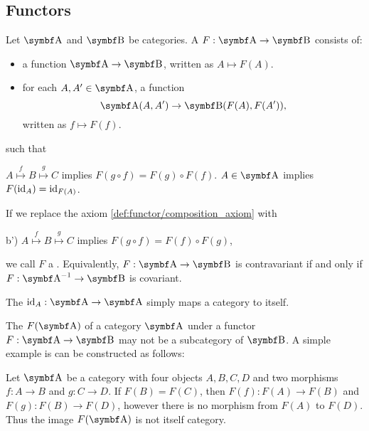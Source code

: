 \subsection{Functors}\label{subsec:functors}

\begin{definition}\label{def:functor}\cite[definitions 1.2.1, 1.2.10]{Leinster2014}
  Let \( \Cat{A} \) and \( \Cat{B} \) be categories. A  \( F: \Cat{A} \to \Cat{B} \) consists of:
  \begin{itemize}
    \item a function \( \Cat{A} \to \Cat{B} \), written as \( A \mapsto F(A) \).
    \item for each \( A, A' \in \Cat{A} \), a function
    \begin{equation*}
      \Cat{A}(A, A') \to \Bold{B}(F(A), F(A')),
    \end{equation*}
    written as \( f \mapsto F(f) \).
  \end{itemize}
  such that
  \begin{defenum}
     \( A \overset f \mapsto B \overset g \mapsto C \) implies \( F(g \circ f) = F(g) \circ F(f) \).
     \( A \in \Cat{A} \) implies \( F(\operatorname{id}_A) = \operatorname{id}_{F(A)} \).
  \end{defenum}

  If we replace the axiom \cref{def:functor/composition_axiom} with
  \begin{defenum}
    \item[b')]\label{def:functor/contravariant_composition_axiom} \( A \overset f \mapsto B \overset g \mapsto C \) implies \( F(g \circ f) = F(f) \circ F(g) \),
  \end{defenum}
  we call \( F \) a . Equivalently, \( F: \Cat{A} \to \Cat{B} \) is contravariant if and only if \( F: \Cat{A}^{-1} \to \Cat{B} \) is covariant.

  The  \( \Id_A: \Cat{A} \to \Cat{A} \) simply maps a category to itself.
\end{definition}

\begin{remark}\label{remark:image_of_functor_maybe_not_subcategory}
  The  \( F(\Cat{A}) \) of a category \( \Cat{A} \) under a functor \( F: \Cat{A} \to \Cat{B} \) may not be a subcategory of \( \Cat{B} \). A simple example is can be constructed as follows:

  Let \( \Cat{A} \) be a category with four objects \( A, B, C, D \) and two morphisms \( f: A \to B \) and \( g: C \to D \). If \( F(B) = F(C) \), then \( F(f): F(A) \to F(B) \) and \( F(g): F(B) \to F(D) \), however there is no morphism from \( F(A) \) to \( F(D) \). Thus the image \( F(\Cat{A}) \) is not itself category.
\end{remark}

